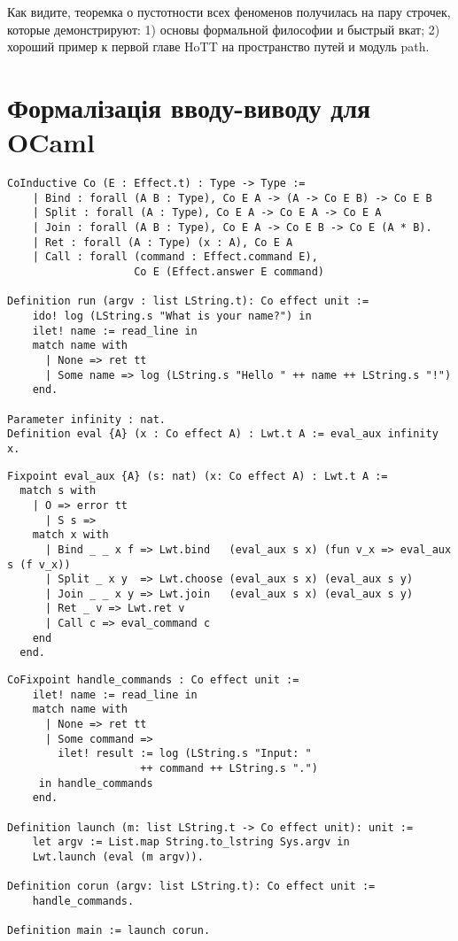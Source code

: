 Как видите, теоремка о пустотности всех феноменов получилась на пару
строчек, которые демонстрируют: 1) основы формальной философии и быстрый вкат;
2) хороший пример к первой главе HoTT на пространство путей и модуль path.

\newpage
\section{Формалізація вводу-виводу для OCaml}

\begin{lstlisting}
CoInductive Co (E : Effect.t) : Type -> Type :=
    | Bind : forall (A B : Type), Co E A -> (A -> Co E B) -> Co E B
    | Split : forall (A : Type), Co E A -> Co E A -> Co E A
    | Join : forall (A B : Type), Co E A -> Co E B -> Co E (A * B).
    | Ret : forall (A : Type) (x : A), Co E A
    | Call : forall (command : Effect.command E),
                    Co E (Effect.answer E command)

Definition run (argv : list LString.t): Co effect unit :=
    ido! log (LString.s "What is your name?") in
    ilet! name := read_line in
    match name with
      | None => ret tt
      | Some name => log (LString.s "Hello " ++ name ++ LString.s "!")
    end.

Parameter infinity : nat.
Definition eval {A} (x : Co effect A) : Lwt.t A := eval_aux infinity x.
\end{lstlisting}

\begin{lstlisting}
Fixpoint eval_aux {A} (s: nat) (x: Co effect A) : Lwt.t A :=
  match s with
    | O => error tt
      | S s =>
    match x with
      | Bind _ _ x f => Lwt.bind   (eval_aux s x) (fun v_x => eval_aux s (f v_x))
      | Split _ x y  => Lwt.choose (eval_aux s x) (eval_aux s y)
      | Join _ _ x y => Lwt.join   (eval_aux s x) (eval_aux s y)
      | Ret _ v => Lwt.ret v
      | Call c => eval_command c
    end
  end.
\end{lstlisting}

\begin{lstlisting}
CoFixpoint handle_commands : Co effect unit :=
    ilet! name := read_line in
    match name with
      | None => ret tt
      | Some command =>
        ilet! result := log (LString.s "Input: "
                     ++ command ++ LString.s ".")
     in handle_commands
    end.

Definition launch (m: list LString.t -> Co effect unit): unit :=
    let argv := List.map String.to_lstring Sys.argv in
    Lwt.launch (eval (m argv)).

Definition corun (argv: list LString.t): Co effect unit :=
    handle_commands.

Definition main := launch corun.
\end{lstlisting}

